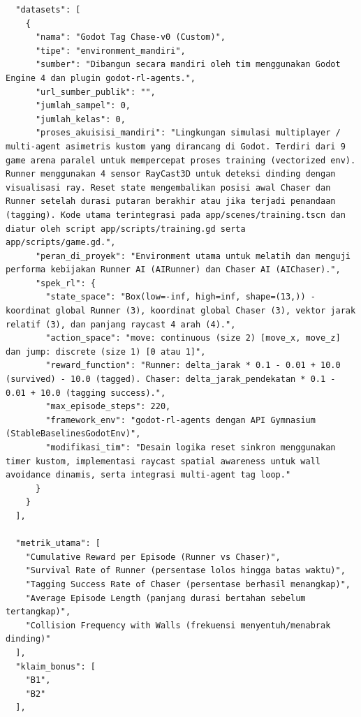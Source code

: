 \documentclass[12pt,a4paper]{article}
\begin{document}
\begin{verbatim}
  "datasets": [
    {
      "nama": "Godot Tag Chase-v0 (Custom)",
      "tipe": "environment_mandiri",
      "sumber": "Dibangun secara mandiri oleh tim menggunakan Godot Engine 4 dan plugin godot-rl-agents.",
      "url_sumber_publik": "",
      "jumlah_sampel": 0,
      "jumlah_kelas": 0,
      "proses_akuisisi_mandiri": "Lingkungan simulasi multiplayer / multi-agent asimetris kustom yang dirancang di Godot. Terdiri dari 9 game arena paralel untuk mempercepat proses training (vectorized env). Runner menggunakan 4 sensor RayCast3D untuk deteksi dinding dengan visualisasi ray. Reset state mengembalikan posisi awal Chaser dan Runner setelah durasi putaran berakhir atau jika terjadi penandaan (tagging). Kode utama terintegrasi pada app/scenes/training.tscn dan diatur oleh script app/scripts/training.gd serta app/scripts/game.gd.",
      "peran_di_proyek": "Environment utama untuk melatih dan menguji performa kebijakan Runner AI (AIRunner) dan Chaser AI (AIChaser).",
      "spek_rl": {
        "state_space": "Box(low=-inf, high=inf, shape=(13,)) - koordinat global Runner (3), koordinat global Chaser (3), vektor jarak relatif (3), dan panjang raycast 4 arah (4).",
        "action_space": "move: continuous (size 2) [move_x, move_z] dan jump: discrete (size 1) [0 atau 1]",
        "reward_function": "Runner: delta_jarak * 0.1 - 0.01 + 10.0 (survived) - 10.0 (tagged). Chaser: delta_jarak_pendekatan * 0.1 - 0.01 + 10.0 (tagging success).",
        "max_episode_steps": 220,
        "framework_env": "godot-rl-agents dengan API Gymnasium (StableBaselinesGodotEnv)",
        "modifikasi_tim": "Desain logika reset sinkron menggunakan timer kustom, implementasi raycast spatial awareness untuk wall avoidance dinamis, serta integrasi multi-agent tag loop."
      }
    }
  ],

  "metrik_utama": [
    "Cumulative Reward per Episode (Runner vs Chaser)",
    "Survival Rate of Runner (persentase lolos hingga batas waktu)",
    "Tagging Success Rate of Chaser (persentase berhasil menangkap)",
    "Average Episode Length (panjang durasi bertahan sebelum tertangkap)",
    "Collision Frequency with Walls (frekuensi menyentuh/menabrak dinding)"
  ],
  "klaim_bonus": [
    "B1",
    "B2"
  ],


\end{verbatim}
\end{document}
